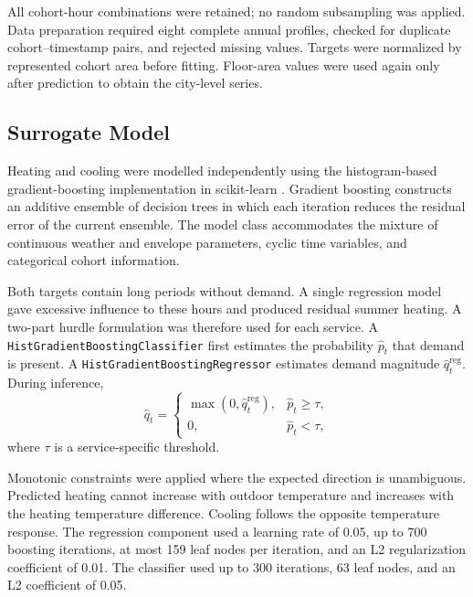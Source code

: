 \documentclass[conference]{IEEEtran}
\begin{document}
All cohort-hour combinations were retained; no random subsampling was applied.
Data preparation required eight complete annual profiles, checked for
duplicate cohort--timestamp pairs, and rejected missing values. Targets were
normalized by represented cohort area before fitting. Floor-area values were
used again only after prediction to obtain the city-level series.

\subsection{Surrogate Model}

Heating and cooling were modelled independently using the histogram-based
gradient-boosting implementation in scikit-learn
\cite{Friedman2001,scikit-learn,Ke2017}. Gradient
boosting constructs an additive ensemble of decision trees in which each
iteration reduces the residual error of the current ensemble. The model class
accommodates the mixture of continuous weather and envelope parameters, cyclic
time variables, and categorical cohort information.

Both targets contain long periods without demand. A single regression model
gave excessive influence to these hours and produced residual summer heating.
A two-part hurdle formulation was therefore used for each service. A
\texttt{HistGradientBoostingClassifier} first estimates the probability
$\widehat p_t$ that demand is present. A
\texttt{HistGradientBoostingRegressor} estimates demand magnitude
$\widehat q_t^{\mathrm{reg}}$. During inference,
\begin{equation}
\widehat q_t =
\begin{cases}
\max(0,\widehat q_t^{\mathrm{reg}}), & \widehat p_t \geq \tau,\\
0, & \widehat p_t < \tau,
\end{cases}
\label{eq:hurdle}
\end{equation}
where $\tau$ is a service-specific threshold.

Monotonic constraints were applied where the expected direction is
unambiguous. Predicted heating cannot increase with outdoor temperature and
increases with the heating temperature difference. Cooling follows the
opposite temperature response. The regression component used a learning rate
of 0.05, up to 700 boosting iterations, at most 159 leaf nodes per iteration,
and an L2 regularization coefficient of 0.01. The classifier used up to 300
iterations, 63 leaf nodes, and an L2 coefficient of 0.05.
\end{document}
